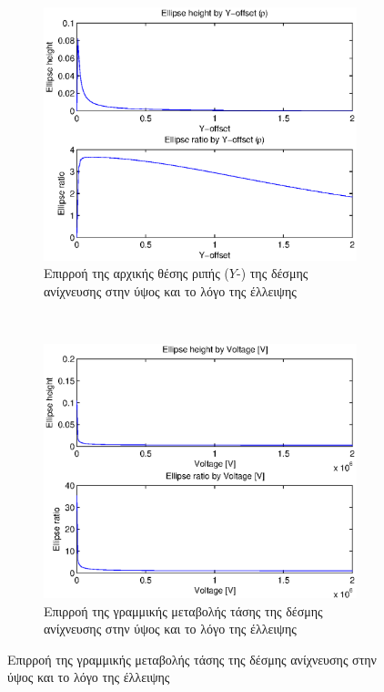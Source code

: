 \begin{figure}[tph]
	\par\bigskip
	\begin{subfigure}{0.45\textwidth}
		\includegraphics[width=0.9\linewidth]{figures/beam-deflection-script-05-elipse-ratio-by-bunch-intensity}
		\centering
		\caption[Επιρροή της αρχικής θέσης ριπής της δέσμης ανίχνευσης στην ύψος και το λόγο της έλλειψης]{Επιρροή της αρχικής θέσης ριπής ($Y$-) της δέσμης ανίχνευσης στην ύψος και το λόγο της έλλειψης}
		\label{fig:beam-deflection-script-05-elipse-ratio-by-bunch-intensity}
	\end{subfigure}
	~
	\begin{subfigure}{0.45\textwidth}
		\includegraphics[width=0.9\linewidth]{figures/beam-deflection-script-06}
		\centering
		\caption{Επιρροή της γραμμικής μεταβολής τάσης της δέσμης ανίχνευσης στην ύψος και το λόγο της έλλειψης}

\end{subfigure}
\end{figure}
